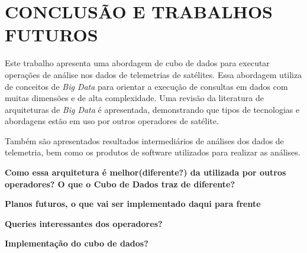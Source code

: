 
\chapter{CONCLUSÃO E TRABALHOS FUTUROS}

Este trabalho apresenta uma abordagem de cubo de dados para executar operações de análise nos dados de telemetrias de satélites. Essa abordagem utiliza de conceitos de \textit{Big Data} para orientar a execução de consultas em dados com muitas dimensões e de alta complexidade. Uma revisão da literatura de arquiteturas de \textit{Big Data} é apresentada, demonstrando que tipos de tecnologias e abordagens estão em uso por outros operadores de satélite.

Também são apresentados resultados intermediários de análises dos dados de telemetria, bem como os produtos de software utilizados para realizar as análises.

\textbf{Como essa arquitetura é melhor(diferente?) da utilizada por outros operadores? O que o Cubo de Dados traz de diferente?}

\textbf{Planos futuros, o que vai ser implementado daqui para frente}

\textbf{Queries interessantes dos operadores?}

\textbf{Implementação do cubo de dados?}

